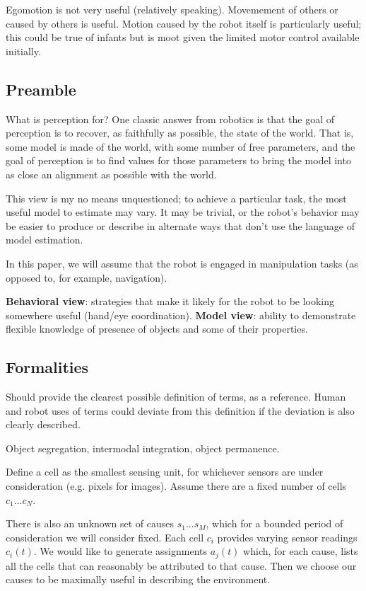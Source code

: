 Egomotion is not very useful (relatively speaking).  Movemement of
others or caused by others is useful.  Motion caused by the robot
itself is particularly useful; this could be true of infants but is
moot given the limited motor control available initially.

\subsection{Preamble}

What is perception for?  One classic answer from robotics is that the
goal of perception is to recover, as faithfully as possible, the state
of the world.  That is, some model is made of the world, with some
number of free parameters, and the goal of perception is to find
values for those parameters to bring the model into as close an
alignment as possible with the world.

This view is my no means unquestioned; to achieve a particular
task, the most useful model to estimate may vary.  It may be
trivial, or the robot's behavior may be easier to produce or
describe in alternate ways that don't use the language of
model estimation.

In this paper, we will assume that the robot is engaged
in manipulation tasks (as opposed to, for example, navigation).

{\bf Behavioral view}: strategies that make it likely for the robot
to be looking somewhere useful (hand/eye coordination).
{\bf Model view}: ability to demonstrate flexible knowledge of presence of 
objects and some of their properties.


\subsection{Formalities}

Should provide the clearest possible definition of terms,
as a reference.  Human and robot uses of terms could deviate
from this definition if the deviation is also clearly described.

Object segregation, intermodal integration, object permanence.

Define a cell as the smallest sensing unit, for whichever sensors are
under consideration (e.g. pixels for images).  Assume there are a
fixed number of cells $c_1...c_{N}$.

There is also an unknown set of causes $s_1...s_{M}$, which for a
bounded period of consideration we will consider fixed.  Each cell
$c_i$ provides varying sensor readings $c_i(t)$.  We would like to
generate assignments $a_j(t)$ which, for each cause, lists all the
cells that can reasonably be attributed to that cause.  Then we choose
our causes to be maximally useful in describing the environment.

